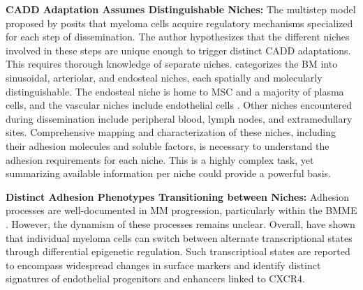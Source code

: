 \textbf{\ac{CADD} Adaptation Assumes Distinguishable Niches:} The multistep
model proposed by \citet{zeissigTumourDisseminationMultiple2020} posits that
myeloma cells acquire regulatory mechanisms specialized for each step of
dissemination. The author hypothesizes that the different niches involved in
these steps are unique enough to trigger distinct \ac{CADD} adaptations. This
requires thorough knowledge of separate niches.
\citet{granataBoneMarrowNiches2022} categorizes the \ac{BM} into sinusoidal,
arteriolar, and endosteal niches, each spatially and molecularly
distinguishable. The endosteal niche is home to \ac{MSC} and a majority of
plasma cells, and the vascular niches
 include endothelial cells
\cite{zehentmeierStaticDynamicComponents2014, wilmoreHereThereAnywhere2017}.
Other niches encountered during dissemination include peripheral blood, lymph
nodes, and extramedullary sites. Comprehensive mapping and characterization of
these niches, including their adhesion molecules and soluble factors, is
necessary to understand the adhesion requirements for each niche. This is a
highly complex task, yet summarizing available information per niche could
provide a powerful basis.


\textbf{Distinct Adhesion Phenotypes Transitioning between Niches:}
Adhesion processes are well-documented in MM progression, particularly within
the \ac{BMME} \cite{bouzerdanAdhesionMoleculesMultiple2022}. However, the
dynamism of these processes remains unclear.
Overall, \citet{fredeDynamicTranscriptionalReprogramming2021} have shown that
individual myeloma cells can switch between alternate transcriptional states
through differential epigenetic regulation. Such transcriptioal states
are reported to encompass widespread changes in surface markers and
identify distinct signatures of endothelial progenitors and enhancers linked to
CXCR4. 


